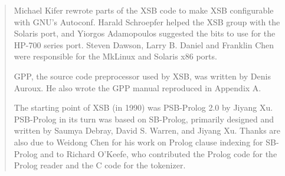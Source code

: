 \begin{quote}
Michael Kifer rewrote parts of the XSB code to make XSB configurable
with GNU's Autoconf.  Harald Schroepfer helped the XSB group with the
Solaris port, and Yiorgos Adamopoulos suggested the bits to use for
the HP-700 series port.  Steven Dawson, Larry B. Daniel and Franklin
Chen were responsible for the MkLinux and Solaris x86 ports.

GPP, the source code preprocessor used by XSB, was written by Denis Auroux.
He also wrote the GPP manual reproduced in Appendix A.

The starting point of XSB (in 1990) was PSB-Prolog 2.0 by Jiyang Xu.
PSB-Prolog in its turn was based on SB-Prolog, primarily designed and
written by Saumya Debray, David S. Warren, and Jiyang Xu.  Thanks are
also due to Weidong Chen for his work on Prolog clause indexing for
SB-Prolog and to Richard O'Keefe, who contributed the Prolog code for
the Prolog reader and the C code for the tokenizer.  

\end{quote}

